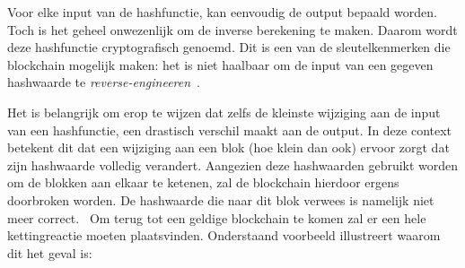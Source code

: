 Voor elke input van de hashfunctie, kan eenvoudig de output bepaald worden. Toch is het geheel onwezenlijk om de inverse berekening te maken. Daarom wordt deze hashfunctie cryptografisch genoemd. Dit is een van de sleutelkenmerken die blockchain mogelijk maken: het is niet haalbaar om de input van een gegeven hashwaarde te \textit{reverse-engineeren}~\autocite{Mansfield2018}. 

Het is belangrijk om erop te wijzen dat zelfs de kleinste wijziging aan de input van een hashfunctie, een drastisch verschil maakt aan de output. In deze context betekent dit dat een wijziging aan een blok (hoe klein dan ook) ervoor zorgt dat zijn hashwaarde volledig verandert. Aangezien deze hashwaarden gebruikt worden om de blokken aan elkaar te ketenen, zal de blockchain hierdoor ergens doorbroken worden. De hashwaarde die naar dit blok verwees is namelijk niet meer correct.~\autocite{Salem2008} Om terug tot een geldige blockchain te komen zal er een hele kettingreactie moeten plaatsvinden. Onderstaand voorbeeld illustreert waarom dit het geval is:

